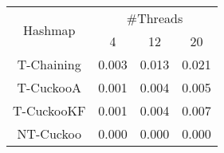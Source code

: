 \begin{tabular}{|c|c|c|c|}
\hline
\multirow{2}{*}{Hashmap} & \multicolumn{3}{c|}{\#Threads}\\\cline{2-4}& 4 & 12 & 20\\
\hline
\hline
T-Chaining & 0.003 & 0.013 & 0.021\\
T-CuckooA & 0.001 & 0.004 & 0.005\\
T-CuckooKF & 0.001 & 0.004 & 0.007\\
NT-Cuckoo & 0.000 & 0.000 & 0.000\\
\hline
\end{tabular}
